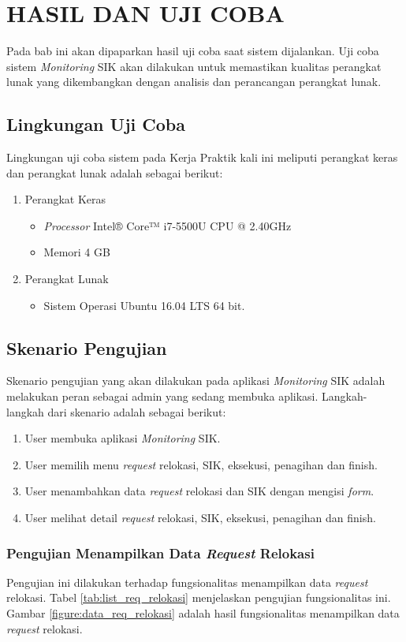 \chapter{HASIL DAN UJI COBA}
Pada bab ini akan dipaparkan hasil uji coba saat sistem dijalankan. Uji coba sistem \textit{Monitoring} SIK akan dilakukan untuk memastikan kualitas perangkat lunak yang dikembangkan dengan analisis dan perancangan perangkat lunak.
\section{Lingkungan Uji Coba}
Lingkungan uji coba sistem pada Kerja Praktik kali ini meliputi perangkat keras dan perangkat lunak adalah sebagai berikut:
\begin{enumerate}
	\item Perangkat Keras
	\begin{itemize}
		\item \textit{Processor} Intel® Core™ i7-5500U CPU @ 2.40GHz
		\item Memori 4 GB
	\end{itemize}
	\item Perangkat Lunak
	\begin{itemize}
		\item Sistem Operasi Ubuntu 16.04 LTS 64 bit.
	\end{itemize}
\end{enumerate}

\section{Skenario Pengujian}
Skenario pengujian yang akan dilakukan pada aplikasi \textit{Monitoring} SIK adalah melakukan peran sebagai admin yang sedang membuka aplikasi. Langkah-langkah dari skenario adalah sebagai berikut:
	\begin{enumerate}
	\item User membuka aplikasi \textit{Monitoring} SIK.
	\item User memilih menu \textit{request} relokasi, SIK, eksekusi, penagihan dan finish.
	\item User menambahkan data \textit{request} relokasi dan SIK dengan mengisi \textit{form}.
	\item User melihat detail \textit{request} relokasi, SIK, eksekusi, penagihan dan finish.
	\end{enumerate}
\subsection{Pengujian Menampilkan Data \textit{Request} Relokasi}
Pengujian ini dilakukan terhadap fungsionalitas menampilkan data \textit{request} relokasi. Tabel \ref{tab:list_req_relokasi} menjelaskan pengujian fungsionalitas ini. Gambar \ref{figure:data_req_relokasi} adalah hasil fungsionalitas menampilkan data \textit{request} relokasi.


